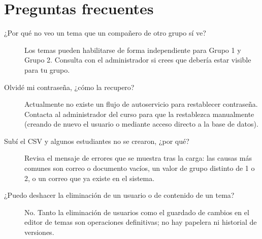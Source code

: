 \documentclass[11pt,a4paper]{article}
\begin{document}
\section{Preguntas frecuentes}

\begin{description}
  \item[¿Por qué no veo un tema que un compañero de otro grupo sí ve?] Los temas pueden habilitarse de forma independiente para Grupo 1 y Grupo 2. Consulta con el administrador si crees que debería estar visible para tu grupo.
  \item[Olvidé mi contraseña, ¿cómo la recupero?] Actualmente no existe un flujo de autoservicio para restablecer contraseña. Contacta al administrador del curso para que la restablezca manualmente (creando de nuevo el usuario o mediante acceso directo a la base de datos).
  \item[Subí el CSV y algunos estudiantes no se crearon, ¿por qué?] Revisa el mensaje de errores que se muestra tras la carga: las causas más comunes son correo o documento vacíos, un valor de grupo distinto de 1 o 2, o un correo que ya existe en el sistema.
  \item[¿Puedo deshacer la eliminación de un usuario o de contenido de un tema?] No. Tanto la eliminación de usuarios como el guardado de cambios en el editor de temas son operaciones definitivas; no hay papelera ni historial de versiones.
\end{description}
\end{document}
